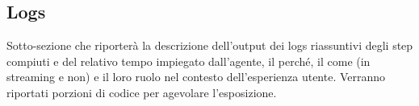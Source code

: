\subsection{Logs}

Sotto-sezione che riporterà la descrizione dell'output dei logs riassuntivi degli step compiuti e del relativo tempo impiegato dall'agente, il perché, il come (in streaming e non) e il loro ruolo nel contesto dell'esperienza utente.
Verranno riportati porzioni di codice per agevolare l'esposizione.

